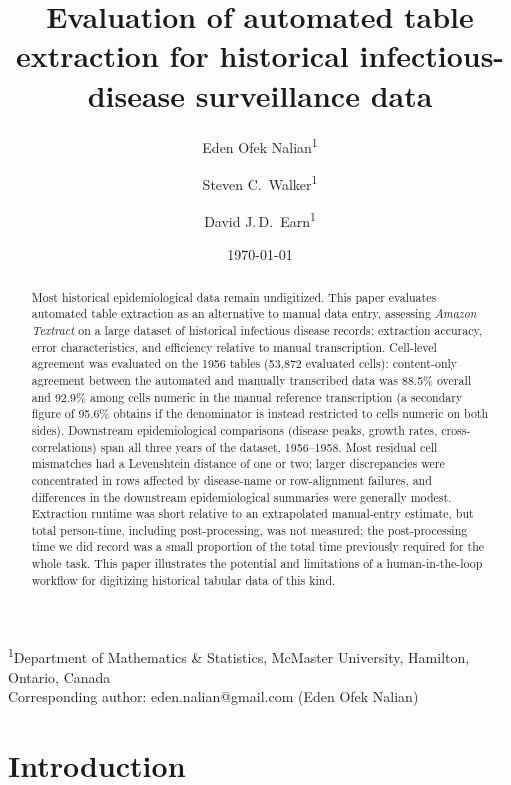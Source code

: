 \documentclass[12pt]{article}
\title{Evaluation of automated table extraction for historical infectious-disease surveillance data}
\author{
  Eden Ofek Nalian\textsuperscript{1} \and
  Steven C.\ Walker\textsuperscript{1} \and
  David J.\,D.\ Earn\textsuperscript{1} 
}
\date{\today}
\begin{document}
\maketitle

\begin{center}
\small
\textsuperscript{1}Department of Mathematics \& Statistics, McMaster University, Hamilton, Ontario, Canada \\

Corresponding author: eden.nalian@gmail.com (Eden Ofek Nalian)

\end{center}




\begin{abstract}
Most historical epidemiological data remain undigitized. This paper evaluates automated table extraction as an alternative to manual data entry, assessing \emph{Amazon Textract} on a large dataset of historical infectious disease records: extraction accuracy, error characteristics, and efficiency relative to manual transcription. Cell-level agreement was evaluated on the 1956 tables (53{,}872 evaluated cells): content-only agreement between the automated and manually transcribed data was 88.5\% overall and 92.9\% among cells numeric in the manual reference transcription (a secondary figure of 95.6\% obtains if the denominator is instead restricted to cells numeric on both sides). Downstream epidemiological comparisons (disease peaks, growth rates, cross-correlations) span all three years of the dataset, 1956--1958. Most residual cell mismatches had a Levenshtein distance of one or two; larger discrepancies were concentrated in rows affected by disease-name or row-alignment failures, and differences in the downstream epidemiological summaries were generally modest. Extraction runtime was short relative to an extrapolated manual-entry estimate, but total person-time, including post-processing, was not measured; the post-processing time we did record was a small proportion of the total time previously required for the whole task. This paper illustrates the potential and limitations of a human-in-the-loop workflow for digitizing historical tabular data of this kind.
\end{abstract}

\section{Introduction} \label{sec:intro}
\end{document}
